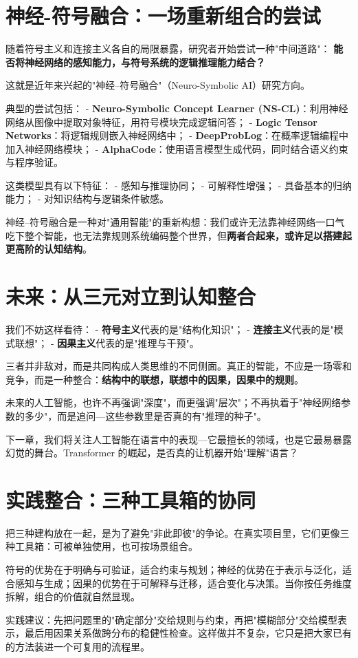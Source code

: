 \section*{神经-符号融合：一场重新组合的尝试}

随着符号主义和连接主义各自的局限暴露，研究者开始尝试一种"中间道路"：
\textbf{能否将神经网络的感知能力，与符号系统的逻辑推理能力结合？}

这就是近年来兴起的"神经–符号融合"（Neuro-Symbolic AI）研究方向。

典型的尝试包括：
- \textbf{Neuro-Symbolic Concept Learner (NS-CL)}：利用神经网络从图像中提取对象特征，用符号模块完成逻辑问答；
- \textbf{Logic Tensor Networks}：将逻辑规则嵌入神经网络中；
- \textbf{DeepProbLog}：在概率逻辑编程中加入神经网络模块；
- \textbf{AlphaCode}：使用语言模型生成代码，同时结合语义约束与程序验证。

这类模型具有以下特征：
- 感知与推理协同；
- 可解释性增强；
- 具备基本的归纳能力；
- 对知识结构与逻辑条件敏感。

神经–符号融合是一种对"通用智能"的重新构想：我们或许无法靠神经网络一口气吃下整个智能，也无法靠规则系统编码整个世界，但\textbf{两者合起来，或许足以搭建起更高阶的认知结构}。

\section*{未来：从三元对立到认知整合}

我们不妨这样看待：
- \textbf{符号主义}代表的是"结构化知识"；
- \textbf{连接主义}代表的是"模式联想"；
- \textbf{因果主义}代表的是"推理与干预"。

三者并非敌对，而是共同构成人类思维的不同侧面。真正的智能，不应是一场零和竞争，而是一种整合：\textbf{结构中的联想，联想中的因果，因果中的规则}。

未来的人工智能，也许不再强调"深度"，而更强调"层次"；不再执着于"神经网络参数的多少"，而是追问---这些参数里是否真的有"推理的种子"。

下一章，我们将关注人工智能在语言中的表现---它最擅长的领域，也是它最易暴露幻觉的舞台。Transformer 的崛起，是否真的让机器开始"理解"语言？

\section*{实践整合：三种工具箱的协同}

把三种建构放在一起，是为了避免"非此即彼"的争论。在真实项目里，它们更像三种工具箱：可被单独使用，也可按场景组合。

符号的优势在于明确与可验证，适合约束与规划；神经的优势在于表示与泛化，适合感知与生成；因果的优势在于可解释与迁移，适合变化与决策。当你按任务维度拆解，组合的价值就自然显现。

实践建议：先把问题里的"确定部分"交给规则与约束，再把"模糊部分"交给模型表示，最后用因果关系做跨分布的稳健性检查。这样做并不复杂，它只是把大家已有的方法装进一个可复用的流程里。

\nocite{*}
\printbibliography[heading=bibintoc, title=\ebibname]
\newpage
